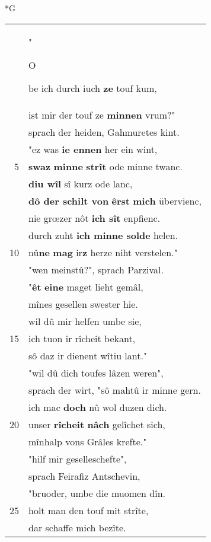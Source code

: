 \documentclass[8pt,a4paper,notitlepage]{article}
\begin{document}
\newpage
\begin{table}[ht]
\begin{minipage}[t]{0.5\linewidth}
\small
\begin{center}*G
\end{center}
\begin{tabular}{rl}
 & "\begin{large}O\end{large}be ich durch iuch \textbf{ze} touf kum,\\ 
 & ist mir der touf ze \textbf{minnen} vrum?"\\ 
 & sprach der heiden, Gahmuretes kint.\\ 
 & "ez was \textbf{ie ennen} her ein wint,\\ 
5 & \textbf{swaz} \textbf{minne} \textbf{strît} ode minne twanc.\\ 
 & \textbf{diu wîl} sî kurz ode lanc,\\ 
 & \textbf{dô der schilt von} \textbf{êrst} \textbf{mich} übervienc,\\ 
 & nie grœzer nôt \textbf{ich sît} enpfienc.\\ 
 & durch zuht \textbf{ich minne solde} helen.\\ 
10 & nû\textbf{ne} \textbf{mag} ir\textbf{z} herze niht verstelen."\\ 
 & "wen meinstû?", sprach Parzival.\\ 
 & "\textbf{êt} \textbf{eine} maget lieht gemâl,\\ 
 & mînes gesellen swester hie.\\ 
 & wil dû mir helfen umbe sie,\\ 
15 & ich tuon ir rîcheit bekant,\\ 
 & sô daz ir dienent wîtiu lant."\\ 
 & "wil dû dich toufes lâzen weren",\\ 
 & sprach der wirt, "sô mahtû ir minne gern.\\ 
 & ich mac \textbf{doch} nû wol duzen dich.\\ 
20 & unser \textbf{rîcheit} \textbf{nâch} gelîchet sich,\\ 
 & mînhalp vons Grâles krefte."\\ 
 & "hilf mir geselleschefte",\\ 
 & sprach Feirafiz Antschevin,\\ 
 & "bruoder, umbe die muomen dîn.\\ 
25 & holt man den touf mit strîte,\\ 
 & dar schaffe mich bezîte.\\ 

\end{tabular}
\end{minipage}
\end{table}
\end{document}
